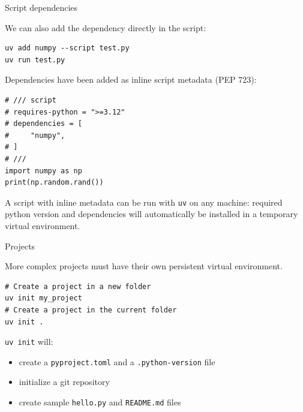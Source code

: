 \documentclass[aspectratio=169,xcolor=dvipsnames,svgnames,x11names,fleqn]{beamer}
\begin{document}
\begin{frame}[containsverbatim]{Script dependencies}

    \footnotesize

    We can also add the dependency directly in the script:
    \begin{verbatim}
uv add numpy --script test.py
uv run test.py
    \end{verbatim}

    Dependencies have been added as inline script metadata (PEP 723):
    \begin{verbatim}
# /// script
# requires-python = ">=3.12"
# dependencies = [
#     "numpy",
# ]
# ///
import numpy as np
print(np.random.rand())
    \end{verbatim}


\begin{center}
    A script with inline metadata can be run with \texttt{uv} on any machine: required python version and dependencies will automatically 
    be installed in a temporary virtual environment.
\end{center}

\end{frame}


\begin{frame}[containsverbatim]{Projects}

    More complex projects must have their own persistent virtual environment.
    \begin{verbatim}
# Create a project in a new folder
uv init my_project
# Create a project in the current folder
uv init .
    \end{verbatim}

    \bigskip
    \texttt{uv init} will:
    \begin{itemize}
        \item create a \texttt{pyproject.toml} and a \texttt{.python-version} file
        \item initialize a git repository
        \item create sample \texttt{hello.py} and \texttt{README.md} files
    \end{itemize}

\end{frame}
\end{document}
